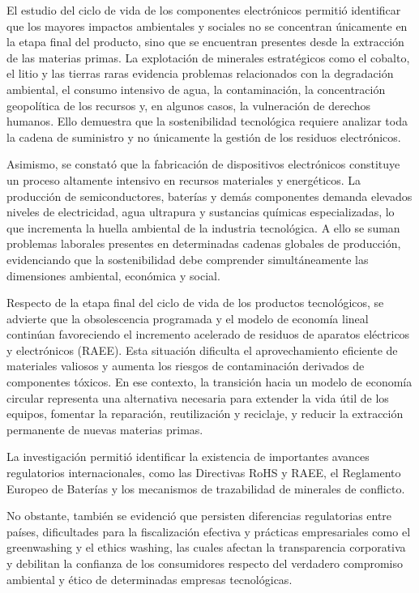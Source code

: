 \documentclass[stu,12pt,a4paper]{apa7}
\begin{document}
El estudio del ciclo de vida de los componentes electrónicos permitió identificar que los mayores impactos ambientales y sociales no se concentran únicamente en la etapa final del producto, sino que se encuentran presentes desde la extracción de las materias primas. La explotación de minerales estratégicos como el cobalto, el litio y las tierras raras evidencia problemas relacionados con la degradación ambiental, el consumo intensivo de agua, la contaminación, la concentración geopolítica de los recursos y, en algunos casos, la vulneración de derechos humanos. Ello demuestra que la sostenibilidad tecnológica requiere analizar toda la cadena de suministro y no únicamente la gestión de los residuos electrónicos. 

Asimismo, se constató que la fabricación de dispositivos electrónicos constituye un proceso altamente intensivo en recursos materiales y energéticos. La producción de semiconductores, baterías y demás componentes demanda elevados niveles de electricidad, agua ultrapura y sustancias químicas especializadas, lo que incrementa la huella ambiental de la industria tecnológica. A ello se suman problemas laborales presentes en determinadas cadenas globales de producción, evidenciando que la sostenibilidad debe comprender simultáneamente las dimensiones ambiental, económica y social. 

Respecto de la etapa final del ciclo de vida de los productos tecnológicos, se advierte que la obsolescencia programada y el modelo de economía lineal continúan favoreciendo el incremento acelerado de residuos de aparatos eléctricos y electrónicos (RAEE). Esta situación dificulta el aprovechamiento eficiente de materiales valiosos y aumenta los riesgos de contaminación derivados de componentes tóxicos. En ese contexto, la transición hacia un modelo de economía circular representa una alternativa necesaria para extender la vida útil de los equipos, fomentar la reparación, reutilización y reciclaje, y reducir la extracción permanente de nuevas materias primas. 

La investigación permitió identificar la existencia de importantes avances regulatorios internacionales, como las Directivas RoHS y RAEE, el Reglamento Europeo de Baterías y los mecanismos de trazabilidad de minerales de conflicto. 

No obstante, también se evidenció que persisten diferencias regulatorias entre países, dificultades para la fiscalización efectiva y prácticas empresariales como el greenwashing y el ethics washing, las cuales afectan la transparencia corporativa y debilitan la confianza de los consumidores respecto del verdadero compromiso ambiental y ético de determinadas empresas tecnológicas. 
\end{document}
